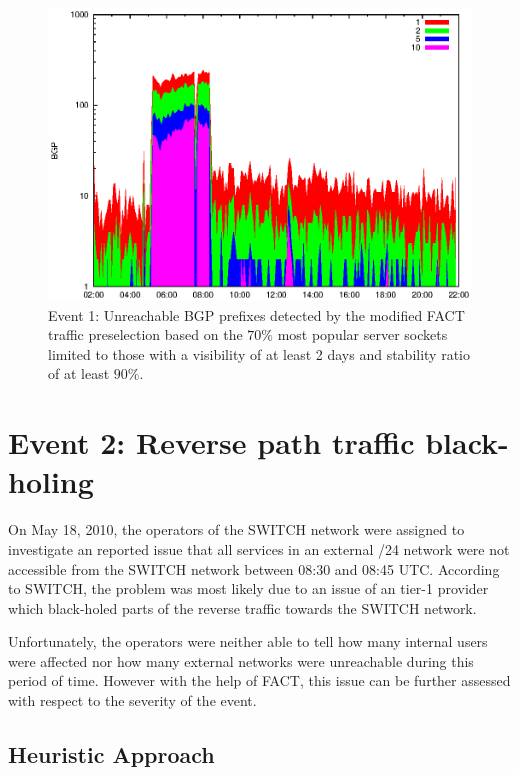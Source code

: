 \begin{figure}
	[p] \centering 
	\includegraphics[width=0.75\linewidth]{images/events/2010_03_25/bgp_log_Set_var_0_1_stab_9_vts_2.eps}
	\caption{Event 1: Unreachable BGP prefixes detected by the modified FACT traffic preselection based on the $70\%$ most popular server sockets limited to those with a visibility of at least 2 days and stability ratio of at least $90\%$.} 
	\label{fig:AMS_IX_FACT_popularVTS2STAB9} 
\end{figure}


\newpage
\section{Event 2: Reverse path traffic black-holing}

On May 18, 2010, the operators of the SWITCH network were assigned to investigate an reported issue that all services in an external /24 network were not accessible from the SWITCH network between 08:30 and 08:45 UTC. According to SWITCH, the problem was most likely due to an issue of an tier-1 provider which black-holed parts of the reverse traffic towards the SWITCH network\citep{SchatzmannPAM2011}.

Unfortunately, the operators were neither able to tell how many internal users were affected nor how many external networks were unreachable during this period of time. However with the help of FACT, this issue can be further assessed with respect to the severity of the event\citep{SchatzmannPAM2011}.

\subsection{Heuristic Approach}

